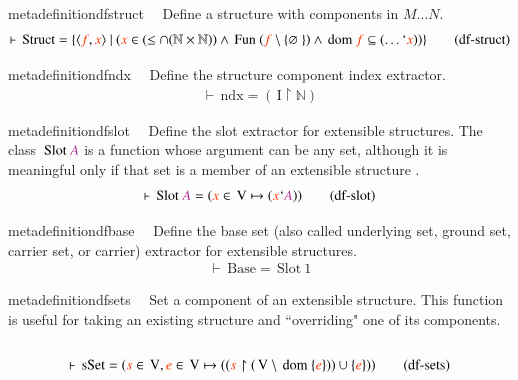 \begin{restatable}{metadefinition}{dfstruct}~~ Define a structure with components in
$M \ldots N$.    ~
\begin{align}
\vdash \,\mathrm{Struct} = \{ \langle \msc{f} , \msc{x} \rangle~\vert~( \msc{x} \in
    ( \le \cap ( \mathbb{N} \times \mathbb{N} ) ) \wedge \,\mathrm{Fun}~ (
    \msc{f} \setminus \{ \varnothing~ \} ) \wedge \,\mathrm{dom}~ \msc{f}
    \subseteq ( \ldots ` \msc{x} ) ) \}\label{eq:df-struct}\tag{df-struct}
\end{align}
\end{restatable}

\begin{restatable}{metadefinition}{dfndx}~~ Define the structure component index
extractor. ~
\begin{align}
\vdash \,\mathrm{ndx} = ( \,\mathrm{I} \restriction \mathbb{N}
    )\label{eq:df-ndx}\tag{df-ndx}
\end{align}
\end{restatable}

\begin{restatable}{metadefinition}{dfslot}~~ Define the slot extractor for extensible
structures.  The class
       $\,\mathrm{Slot}~ \mc{A}$ is a function whose argument can be any set,
although it is
       meaningful only if that set is a member of an extensible structure
.  ~
\begin{align}
\vdash \,\mathrm{Slot}~ \mc{A} = ( \msc{x} \in \,\mathrm{V} \mapsto ( \msc{x} `
    \mc{A} ) )\label{eq:df-slot}\tag{df-slot}
\end{align}
\end{restatable}

\begin{restatable}{metadefinition}{dfbase}~~ Define the base set (also called
underlying set, ground set, carrier set,
     or carrier) extractor for extensible structures.  ~  ~
\begin{align}
\vdash \,\mathrm{Base} = \,\mathrm{Slot}~ 1\label{eq:df-base}\tag{df-base}
\end{align}
\end{restatable}

\begin{restatable}{metadefinition}{dfsets}~~ Set a component of an extensible
structure.  This function is useful for
       taking an existing structure and ``overriding" one of its components.
        ~
\begin{align}
\vdash \,\mathrm{sSet} = ( \msc{s} \in \,\mathrm{V} , \msc{e} \in \,\mathrm{V}
    \mapsto ( ( \msc{s} \restriction ( \,\mathrm{V} \setminus \,\mathrm{dom}~ \{
    \msc{e} \} ) ) \cup \{ \msc{e} \} ) )\label{eq:df-sets}\tag{df-sets}
\end{align}
\end{restatable}

